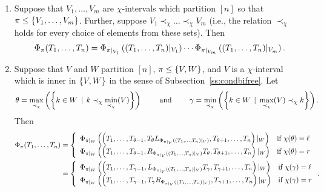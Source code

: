 \begin{definition}
\begin{enumerate}[label=(\roman*)]
		\item\label{def:bimult:iii} 
			Suppose that $V_1, \ldots, V_m$ are $\chi$-intervals which partition $[n]$ so that $\pi \leq \left\{V_1, \ldots, V_m\right\}$.
			Further, suppose $V_1 \prec_\chi \ldots \prec_\chi V_m$ (i.e., the relation $\prec_\chi$ holds for every choice of elements from these sets).
			Then
			\[
				\Phi_\pi(T_1, \ldots, T_n) = \Phi_{\pi|_{V_1}}\left((T_1, \ldots, T_n)|_{V_1}\right) \cdots \Phi_{\pi|_{V_m}}\left((T_1, \ldots, T_n)|_{V_m}\right).
			\]

		\item\label{def:bimult:iv} Suppose that $V$ and $W$ partition $[n]$, $\pi \leq \left\{V, W\right\}$, and $V$ is a $\chi$-interval which is inner in $\left\{V,W\right\}$ in the sense of Subsection~\ref{ss:condbifree}.
			Let
			\[
				\theta = \max_{\prec_\chi}\left(\left\{k \in W
				\, \mid \, k \prec_\chi \min_{\prec_\chi}(V)\right\}\right) \qquad\text{ and } \qquad \gamma = \min_{\prec_\chi}\left(\left\{k \in W
				\, \mid \, \max_{\prec_\chi}(V) \prec_\chi k\right\}\right).
			\]
			Then
			\begin{align*}
				\Phi_\pi(T_1, \ldots, T_n) &= \left\{
					\begin{array}{ll}
						\Phi_{\pi|_{W}}\left(\left(T_1, \ldots, T_{\theta-1}, T_\theta L_{\Phi_{\pi|_{V}}\left((T_1,\ldots, T_n)|_{V}\right)}, T_{\theta+1}, \ldots, T_n\right)|_{W}\right)
						& \text{if } \chi(\theta) = \ell \\
						\Phi_{\pi|_{W}}\left(\left(T_1, \ldots, T_{\theta-1}, R_{\Phi_{\pi|_{V}}\left((T_1,\ldots, T_n)|_{V}\right)} T_\theta, T_{\theta+1}, \ldots, T_n\right)|_{W}\right)
						& \text{if } \chi(\theta) = r 
				\end{array} \right. \\
				&= \left\{
					\begin{array}{ll}
						\Phi_{\pi|_{W}}\left(\left(T_1, \ldots, T_{\gamma-1},
						L_{\Phi_{\pi|_{V}}\left((T_1,\ldots, T_n)|_{V}\right)} T_\gamma, T_{\gamma+1}, \ldots, T_n\right)|_{W}\right)
						& \text{if } \chi(\gamma) = \ell
						\\
						\Phi_{\pi|_{W}}\left(\left(T_1, \ldots, T_{\gamma-1}, T_\gamma R_{\Phi_{\pi|_{V}}\left((T_1,\ldots, T_n)|_{V}\right)}, T_{\gamma+1}, \ldots, T_n\right)|_{W}\right) & \text{if } \chi(\gamma) = r
				\end{array} \right. .
			\end{align*}
	\end{enumerate}
\end{definition}







